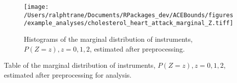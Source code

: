 \documentclass[AMA,STIX1COL,]{WileyNJD-v2}
\begin{document}
\begin{figure}[ht]
  \center
  \texttt{[image: /Users/ralphtrane/Documents/RPackages\_dev/ACEBounds/figures/example\_analyses/cholesterol\_heart\_attack\_marginal\_Z.tiff]}
  \caption{Histograms of the marginal distribution of instruments, $P(Z = z), z=0,1,2$, estimated after preprocessing.}
  \label{fig:marginal-distribution-of-instruments-cholesterol-heart-attack}
\end{figure}

\begin{table}[ht]
  \caption{Table of the marginal distribution of instruments, $P(Z = z), z = 0,1,2$, estimated after preprocessing for analysis.}
  \label{tab:marginal-distribution-of-instruments-lung-cancer}
  \begin{minipage}{0.5\linewidth}
    \center
    

\end{minipage}
\end{table}
\end{document}
